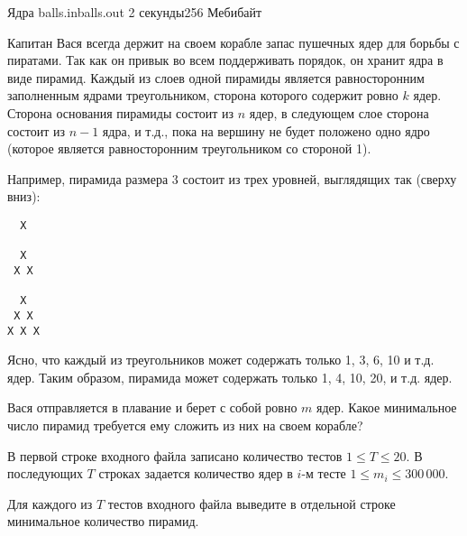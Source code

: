 \begin{problem}{Ядра}
{balls.in}{balls.out}
{2 секунды}{256 Мебибайт}

Капитан Вася всегда держит на своем корабле запас пушечных ядер
для борьбы с пиратами.
Так как он привык во всем поддерживать порядок, он хранит
ядра в виде пирамид. Каждый из слоев 
одной пирамиды является равносторонним заполненным ядрами
треугольником, сторона которого содержит ровно $k$ ядер. Сторона основания
пирамиды состоит из $n$ ядер, в следующем слое сторона состоит из
$n-1$ ядра, и т.д., пока на вершину не будет положено одно ядро
(которое является равносторонним треугольником со стороной 1).

Например, пирамида размера 3 состоит из трех уровней, выглядящих так
(сверху вниз):

\begin{verbatim}
  X

  X
 X X

  X
 X X
X X X
\end{verbatim}

Ясно, что каждый из треугольников может содержать только 1, 3, 6, 10 и т.д.
ядер. Таким образом, пирамида может содержать только 1, 4, 10, 20, и т.д. ядер.

Вася отправляется в плавание и берет с собой ровно $m$ ядер.
Какое минимальное число пирамид требуется ему сложить из них на
своем корабле?

\InputFile

В первой строке входного файла записано количество тестов $1\le T\le 20$. 
В последующих $T$ строках задается количество ядер 
в $i$-м тесте $1\le m_i\le 300\,000$.

\OutputFile

Для каждого из $T$ тестов входного файла выведите в отдельной
строке минимальное количество
пирамид.

\Example

\begin{example}
%
\end{example}

\end{problem}
